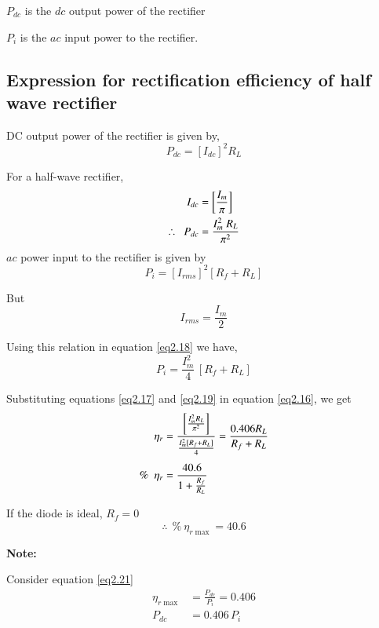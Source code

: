 $P_{dc}$ is the $dc$ output power of the rectifier

$P_i$ is the $ac$ input power to the rectifier.

\subsection{Expression for rectification efficiency of half wave
  rectifier}\label{subsec2.5.1}

DC output power of the rectifier is given by, 
$$
P_{dc} = [I_{dc}]^2 R_L
$$

For a half-wave rectifier,
\begin{align}
I_{dc} & = \left[\frac{I_{m}}{\pi} \right] \notag\\
\therefore ~~ P_{dc} & = \frac{I^2_m\; R_L}{\pi^2} \label{eq2.17}
\end{align}
$ac$ power input to the rectifier is given by 
\begin{equation}
P_i = [I_{rms}]^2 [R_f + R_L] \label{eq2.18}
\end{equation}

\eject

But
$$
I_{rms} = \frac{I_m}{2}
$$

Using this relation in equation \eqref{eq2.18} we have,
\begin{equation}
P_i = \frac{I^2_m}{4}\, [R_f + R_L] \label{eq2.19}
\end{equation}

Substituting equations \eqref{eq2.17} and \eqref{eq2.19} in equation
\eqref{eq2.16}, we get
\begin{align}
\eta_r & = \frac{\left[\frac{I^2_m R_L}{\pi^2} \right]}{\frac{I^2_m[R_{f}+R_{L}]}{4}} = \frac{0.406 R_L}{R_f + R_L} \notag\\[4pt]
\% ~~ \eta_r & = \frac{40.6}{1+\frac{R_f}{R_L}}  \label{eq2.20}
\end{align}

If the diode is ideal, $R_f = 0$
\begin{equation}
\therefore~~ \% ~ \eta_{r \max} = 40.6 \label{eq2.21}
\end{equation}

\medskip
\noindent
\textbf{Note:}

Consider equation \eqref{eq2.21}
\begin{align*}
\eta_{r \max} & = \frac{P_{dc}}{P_i} = 0.406\\
P_{dc} & = 0.406\, P_i
\end{align*}

